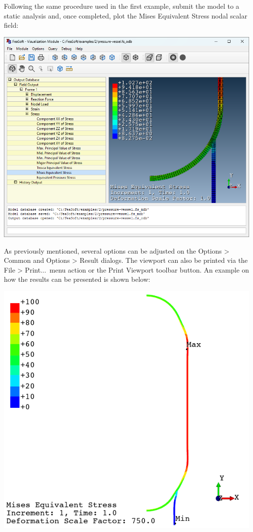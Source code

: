 \documentclass[
    11pt,        %
    a4paper,     %
    final,       %
    fleqn,       %
    notitlepage, %
    onecolumn,   %
    oneside,     %
]{article}
\begin{document}
Following the same procedure used in the first example, submit the model to a static analysis and, once completed, plot the Mises Equivalent Stress nodal scalar field:
\begin{center}
    \includegraphics[scale=0.5]{fig/ui-2-12.png}
\end{center}

As previously mentioned, several options can be adjusted on the Options > Common and Options > Result dialogs. The viewport can also be printed via the File > Print...\ menu action or the Print Viewport toolbar button. An example on how the results can be presented is shown below:
\begin{center}
    \includegraphics[scale=0.5]{fig/ui-2-13.png}
\end{center}
\end{document}
